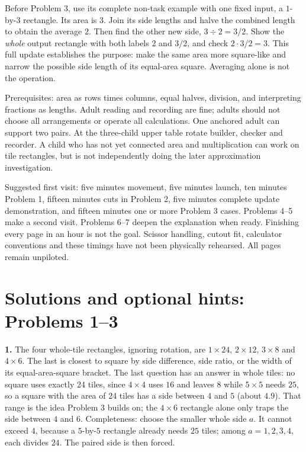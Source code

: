 \documentclass[11pt,letterpaper]{article}
\begin{document}
Before Problem 3, use its complete non-task example with one fixed input, a $1$-by-$3$ rectangle. Its area is $3$. Join its side lengths and halve the combined length to obtain the average $2$. Then find the other new side, $3\div2=3/2$. Show the \emph{whole} output rectangle with both labels $2$ and $3/2$, and check $2\cdot3/2=3$. This full update establishes the purpose: make the same area more square-like and narrow the possible side length of its equal-area square. Averaging alone is not the operation.

Prerequisites: area as rows times columns, equal halves, division, and interpreting fractions as lengths. Adult reading and recording are fine; adults should not choose all arrangements or operate all calculations. One anchored adult can support two pairs. At the three-child upper table rotate builder, checker and recorder. A child who has not yet connected area and multiplication can work on tile rectangles, but is not independently doing the later approximation investigation.

Suggested first visit: five minutes movement, five minutes launch, ten minutes Problem 1, fifteen minutes cuts in Problem 2, five minutes complete update demonstration, and fifteen minutes one or more Problem 3 cases. Problems 4--5 make a second visit. Problems 6--7 deepen the explanation when ready. Finishing every page in an hour is not the goal. Scissor handling, cutout fit, calculator conventions and these timings have not been physically rehearsed. All pages remain unpiloted.
\newpage
\section*{Solutions and optional hints: Problems 1--3}
\textbf{1.} The four whole-tile rectangles, ignoring rotation, are $1\times24$, $2\times12$, $3\times8$ and $4\times6$. The last is closest to square by side difference, side ratio, or the width of its equal-area-square bracket. The last question has an answer in whole tiles: no square uses exactly 24 tiles, since $4\times4$ uses $16$ and leaves $8$ while $5\times5$ needs $25$, so a square with the area of 24 tiles has a side between $4$ and $5$ (about $4.9$). That range is the idea Problem 3 builds on; the $4\times6$ rectangle alone only traps the side between $4$ and $6$. Completeness: choose the smaller whole side $a$. It cannot exceed $4$, because a $5$-by-$5$ rectangle already needs $25$ tiles; among $a=1,2,3,4$, each divides $24$. The paired side is then forced.
\end{document}
